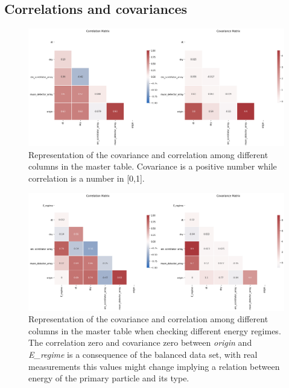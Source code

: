 \documentclass{article}
\begin{document}
\begin{appendices}
\subsection{Correlations and covariances}
 \begin{figure}[!h]
    \centering
    \includegraphics[width=\textwidth]{imgs/covcorr.png}
    \caption{Representation of the covariance and correlation among different columns in the master table. Covariance is a positive number while correlation is a number in [0,1].}
    \label{fig:covcorr}
\end{figure}
 \begin{figure}[!h]
    \centering
    \includegraphics[width=\textwidth]{imgs/covcorr_ener.png}
    \caption{Representation of the covariance and correlation among different columns in the master table when checking different energy regimes. The correlation zero and covariance zero between \emph{origin} and \emph{E\_regime} is a consequence of the balanced data set, with real measurements this values might change implying a relation between energy of the primary particle and its type.}
    \label{fig:covcorr_ener}
\end{figure}
\newpage

\end{appendices}
\end{document}
